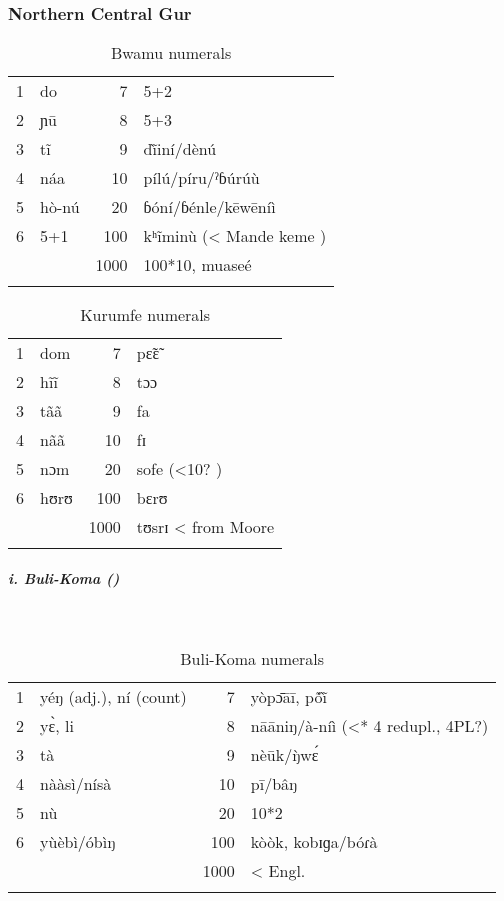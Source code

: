 \subsubsection{Northern Central Gur}%
\begin{table}
\caption{\label{tab:3:164}Bwamu numerals}


\begin{tabularx}{\textwidth}{lXrl}
\lsptoprule

{1} & do & {7} & 5+2\\
{2} & ɲū & {8} & 5+3\\
{3} & t{\~{i}} & {9} & d{\`ĩ}iní/dènú\\
{4} & náa & {10} & pílú/píru/ˀɓúrú{\`{u}}\\
{5} & hò-nú & {20} & ɓóní/ɓénle/kēwēníì\\
{6} & 5+1 & {100} & kʰ{\~{i}}min{\`{u}} (< Mande keme )\\
&  & {1000} & 100*10, muaseé\\
\lspbottomrule
\end{tabularx}
\end{table}

\clearpage 
{}%
\begin{table}
\caption{\label{tab:3:165}Kurumfe numerals}


\begin{tabularx}{\textwidth}{lXrl}
\lsptoprule

{1} & dom & {7} & p{\~{ɛ}}{\~{ɛ}}\\
{2} & h{\~{i}}{\~{i}} & {8} & tɔɔ\\
{3} & t{\~{a}}{\~{a}} & {9} & fa\\
{4} & n{\~{a}}{\~{a}} & {10} & fɪ\\
{5} & nɔm & {20} & sofe (<10? )\\
{6} & hʊrʊ & {100} & bɛrʊ\\
&  & {1000} & tʊsrɪ < from Moore\\
\lspbottomrule
\end{tabularx}
\end{table}

 
\subparagraph{i. Buli-Koma ()}
~
\begin{table}
\caption{\label{tab:3:166}Buli-Koma numerals}


\begin{tabularx}{\textwidth}{lXrl}
\lsptoprule

{1} & yéŋ (adj.), ní (count) & {7} & yòp{\={ɔ}}āī, p{\'{\~o}}{\`ĩ}\\
{2} & y{\`{ɛ}}, li & {8} & nāāniŋ/à-níì (<* 4 redupl., 4PL?)\\
{3} & tà & {9} & nèūk/{\`{ŋ}}w{\'{ɛ}}\\
{4} & nààsì/nísà & {10} & pī/bâŋ\\
{5} & n{\`{u}} & {20} & 10*2\\
{6} & y{\`{u}}èbì/óbìŋ & {100} & kòòk, kobɪɡa/bóɾà\\
&  & {1000} & < Engl.\\
\lspbottomrule
\end{tabularx}
\end{table}

